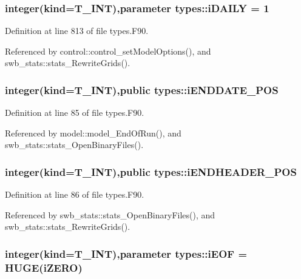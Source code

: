 \hypertarget{namespacetypes_ad8ad58046e9a408cde943dcc94b88167}{
\subsubsection[{iDAILY}]{\setlength{\rightskip}{0pt plus 5cm}integer(kind={\bf T\_\-INT}),parameter {\bf types::iDAILY} = 1}}
\label{namespacetypes_ad8ad58046e9a408cde943dcc94b88167}


Definition at line 813 of file types.F90.



Referenced by control::control\_\-setModelOptions(), and swb\_\-stats::stats\_\-RewriteGrids().

\hypertarget{namespacetypes_af25078a2a39ad338a062b8551e940824}{
\subsubsection[{iENDDATE\_\-POS}]{\setlength{\rightskip}{0pt plus 5cm}integer(kind={\bf T\_\-INT}),public {\bf types::iENDDATE\_\-POS}}}
\label{namespacetypes_af25078a2a39ad338a062b8551e940824}


Definition at line 85 of file types.F90.



Referenced by model::model\_\-EndOfRun(), and swb\_\-stats::stats\_\-OpenBinaryFiles().

\hypertarget{namespacetypes_a9ab0a4f51d8fd66826d7d3079ecfdbc4}{
\subsubsection[{iENDHEADER\_\-POS}]{\setlength{\rightskip}{0pt plus 5cm}integer(kind={\bf T\_\-INT}),public {\bf types::iENDHEADER\_\-POS}}}
\label{namespacetypes_a9ab0a4f51d8fd66826d7d3079ecfdbc4}


Definition at line 86 of file types.F90.



Referenced by swb\_\-stats::stats\_\-OpenBinaryFiles(), and swb\_\-stats::stats\_\-RewriteGrids().

\hypertarget{namespacetypes_ad760d56012336a0edb070999d519902f}{
\subsubsection[{iEOF}]{\setlength{\rightskip}{0pt plus 5cm}integer(kind={\bf T\_\-INT}),parameter {\bf types::iEOF} = HUGE({\bf iZERO})}}
\label{namespacetypes_ad760d56012336a0edb070999d519902f}


